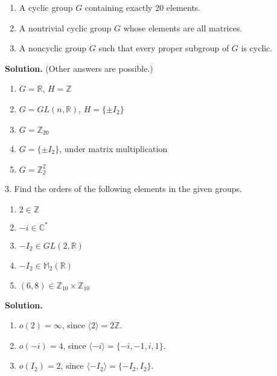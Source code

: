 \documentclass[10pt,]{book}
\theoremstyle{plain}
\theoremstyle{definition}
\theoremstyle{definition}
\theoremstyle{definition}
\theoremstyle{definition}
\numberwithin{equation}{section}
\def\Z{\mathbb{Z}}
\def\R{\mathbb{R}}
\def\C{\mathbb{C}}
\def\M{\mathbb{M}}
\begin{document}
\begin{exerciselist}
\begin{enumerate}[label=(\alph*)]
\item\hypertarget{li-279}{}A cyclic group \(G\) containing exactly 20 elements.%
\item\hypertarget{li-280}{}A nontrivial cyclic group \(G\) whose elements are all matrices.%
\item\hypertarget{li-281}{}A noncyclic group \(G\) such that every proper subgroup of \(G\) is cyclic.%
\end{enumerate}
%
\par\smallskip
\par\smallskip
\noindent\textbf{Solution.}\hypertarget{solution-35}{}\quad
(Other answers are possible.) \leavevmode%
\begin{enumerate}[label=(\alph*)]
\item\hypertarget{li-282}{}\(G=\R\), \(H=\Z\)%
\item\hypertarget{li-283}{}\(G=GL(n,\R)\), \(H=\{\pm I_2\}\)%
\item\hypertarget{li-284}{}\(G=\Z_{20}\)%
\item\hypertarget{li-285}{}\(G=\{\pm I_2\}\), under matrix multiplication%
\item\hypertarget{li-286}{}\(G=\Z_2^2\)%
\end{enumerate}
%
\item[3.]\hypertarget{exercise-36}{}Find the orders of the following elements in the given groups. \leavevmode%
\begin{enumerate}[label=(\alph*)]
\item\hypertarget{li-287}{}\(2\in \Z\)%
\item\hypertarget{li-288}{}\(-i\in \C^*\)%
\item\hypertarget{li-289}{}\(-I_2\in GL(2,\R)\)%
\item\hypertarget{li-290}{}\(-I_2\in \M_2(\R)\)%
\item\hypertarget{li-291}{}\((6,8)\in \Z_{10}\times \Z_{10}\)%
\end{enumerate}
%
\par\smallskip
\par\smallskip
\noindent\textbf{Solution.}\hypertarget{solution-36}{}\quad
\leavevmode%
\begin{enumerate}[label=(\alph*)]
\item\hypertarget{li-292}{}\(o(2)=\infty\), since \(\langle 2\rangle =2\Z\).%
\item\hypertarget{li-293}{}\(o(-i)=4\), since \(\langle -i\rangle =\{-i,-1,i,1\}\).%
\item\hypertarget{li-294}{}\(o(I_2)=2\), since \(\langle -I_2\rangle =\{-I_2,I_2\}\).%

\end{enumerate}
\end{exerciselist}
\end{document}
